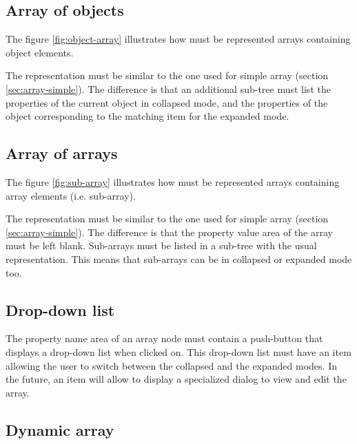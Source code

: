 \documentclass[a4paper, twoside]{report}
\begin{document}

\subsection{Array of objects\label{sec:array-object}}

The figure \ref{fig:object-array} illustrates how must be represented arrays containing object
elements.

The representation must be similar to the one used for simple array (section
\ref{sec:array-simple}). The difference is that an additional sub-tree must list the properties of the
current object in collapsed mode, and the properties of the object corresponding to the matching
item for the expanded mode.


\subsection{Array of arrays\label{sec:array-subarray}}

The figure \ref{fig:sub-array} illustrates how must be represented arrays containing array elements
(i.e. sub-array).

The representation must be similar to the one used for simple array (section
\ref{sec:array-simple}). The difference is that the property value area of the array must be left
blank. Sub-arrays must be listed in a sub-tree with the usual representation. This means that
sub-arrays can be in collapsed or expanded mode too.


\subsection{Drop-down list\label{sec:array-dropdownlist}}

The property name area of an array node must contain a push-button that displays a drop-down list
when clicked on. This drop-down list must have an item allowing the user to switch between the collapsed and
the expanded modes. In the future, an item will allow to display a specialized dialog to view and
edit the array.

\subsection{Dynamic array\label{sec:array-dynamic}}
\end{document}
